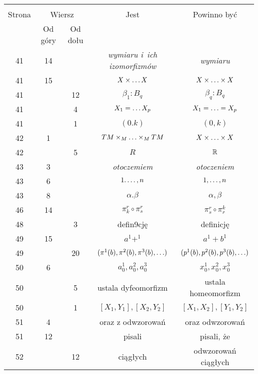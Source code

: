 \documentclass[a4paper,11pt]{article}
\begin{document}
\begin{center}
  \begin{tabular}{|c|c|c|c|c|}
    \hline
    & \multicolumn{2}{c|}{} & & \\
    Strona & \multicolumn{2}{c|}{Wiersz} & Jest
                              & Powinno być \\ \cline{2-3}
    & Od góry & Od dołu & & \\
    \hline
    41  & 14 & & \emph{wymiaru i~ich izomorfizmów} & \emph{wymiaru} \\
    41  & 15 & & $X \times \ldots X$ & $X \times \ldots \times X$ \\
    41  & & 12 & $\beta_{ 1 } : B_{ q }$ & $\beta_{ q } : B_{ q }$ \\
    41  & &  4 & $X_{ 1 } = \ldots X_{ p }$ & $X_{ 1 } = \ldots = X_{ p }$ \\
    41  & &  1 & $( 0. k )$ & $( 0, k )$ \\
    42  &  1 & & $TM \times_{ M } \ldots \times_{ M } TM$ & $X \times \ldots \times X$ \\
    42  & &  5 & $R$ & $\mathbb{R}$ \\
    43  &  3 & & \emph{otoczemiem} & \emph{otoczeniem} \\
    43  &  6 & & $1 . \ldots, n$ & $1, \ldots, n$ \\
    43  &  8 & & $\alpha. \beta$ & $\alpha, \beta$ \\
    46  & 14 & & $\pi_{ k }^{ r } \circ \pi^{ r }_{ s }$
           & $\pi_{ s }^{ r } \circ \pi^{ k }_{ r }$ \\
    48  & &  3 & defin9cję & definicję \\
    49  & 15 & & $a^{ 1 } + ^{ 1 }$ & $a^{ 1 } + b^{ 1 }$ \\
    49  & & 20 & $( \pi^{ 1 } ( b ), \pi^{ 2 } ( b ), \pi^{ 3 } ( b ), \ldots )$
           & $( p^{ 1 } ( b ), p^{ 2 } ( b ), p^{ 3 } ( b ), \ldots )$ \\
    50  &  6 & & $a_{ 0 }^{ 1 }, a_{ 0 }^{ 2 }, a_{ 0 }^{ 3 }$
           & $x_{ 0 }^{ 1 }, x_{ 0 }^{ 2 }, x_{ 0 }^{ 3 }$ \\
    50  & &  5 & ustala dyfeomorfizm & ustala homeomorfizm \\
    50  & & 1 & $[ X_{ 1 }, Y_{ 1 }], [ X_{ 2 }, Y_{ 2 } ]$
           & $[ X_{ 1 }, X_{ 2 }], [ Y_{ 1 }, Y_{ 2 } ]$ \\
    51  &  4 & & oraz z odwzorowań & oraz odwzorowań \\
    51  & 12 & & pisali & pisali, że \\
    52  & & 12 & ciągłych & odwzorowań ciągłych \\

\end{tabular}
\end{center}
\end{document}
